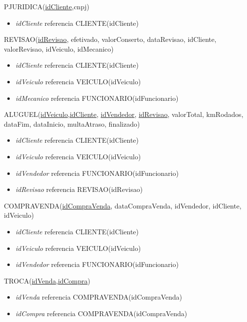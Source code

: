 \documentclass[brazil, a4paper,12pt]{article}
\begin{document}
\vspace{1cm}

PJURIDICA(\underline{idCliente},cnpj)
\begin{itemize}
\item \emph{idCliente} referencia CLIENTE(idCliente)
\end{itemize}

\vspace{1cm}

REVISAO(\underline{idRevisao}, efetivado, valorConserto, dataRevisao, idCliente, valorRevisao, idVeiculo, idMecanico)

\begin{itemize}
\item \emph{idCliente} referencia CLIENTE(idCliente)
\item \emph{idVeiculo} referencia VEICULO(idVeiculo)
\item \emph{idMecanico} referencia FUNCIONARIO(idFuncionario)
\end{itemize}

\vspace{1cm}

ALUGUEL(\underline{idVeiculo},\underline{idCliente}, \underline{idVendedor}, \underline{idRevisao}, valorTotal, kmRodados, dataFim, dataInicio, multaAtraso, finalizado)

\begin{itemize}
\item \emph{idCliente} referencia CLIENTE(idCliente)
\item \emph{idVeiculo} referencia VEICULO(idVeiculo)
\item \emph{idVendedor} referencia FUNCIONARIO(idFuncionario)
\item \emph{idRevisao} referencia REVISAO(idRevisao)
\end{itemize}

\vspace{1cm}

COMPRAVENDA(\underline{idCompraVenda}, dataCompraVenda, idVendedor, idCliente, idVeiculo)

\begin{itemize}
\item \emph{idCliente} referencia CLIENTE(idCliente)
\item \emph{idVeiculo} referencia VEICULO(idVeiculo)
\item \emph{idVendedor} referencia FUNCIONARIO(idFuncionario)
\end{itemize}

\vspace{1cm}

TROCA(\underline{idVenda},\underline{idCompra})
\begin{itemize}
\item \emph{idVenda} referencia COMPRAVENDA(idCompraVenda)
\item \emph{idCompra} referencia COMPRAVENDA(idCompraVenda)
\end{itemize}
\end{document}
